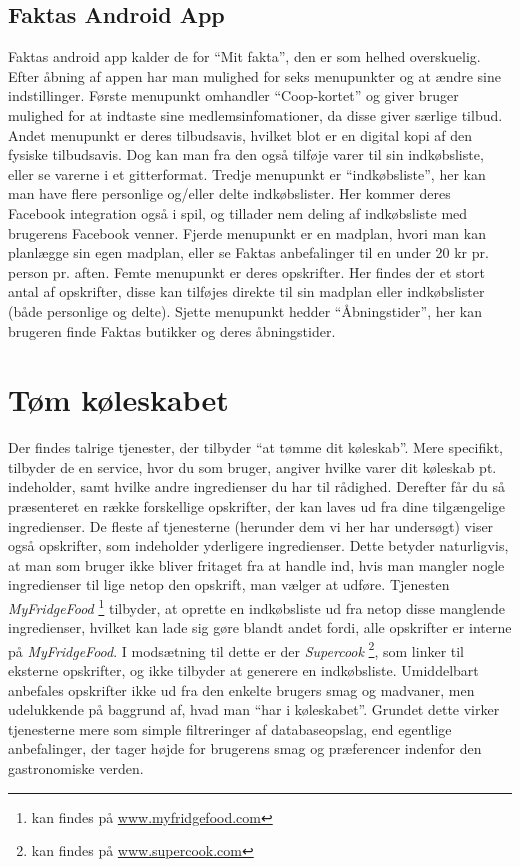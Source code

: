 \subsection{Faktas Android App}
Faktas android app kalder de for ``Mit fakta'', den er som helhed overskuelig.
Efter åbning af appen har man mulighed for seks menupunkter og at ændre sine indstillinger.
Første menupunkt omhandler ``Coop-kortet'' og giver bruger mulighed for at indtaste sine medlemsinfomationer, da disse giver særlige tilbud.
Andet menupunkt er deres tilbudsavis, hvilket blot er en digital kopi af den fysiske tilbudsavis. 
Dog kan man fra den også tilføje varer til sin indkøbsliste, eller se varerne i et gitterformat.
Tredje menupunkt er ``indkøbsliste'', her kan man have flere personlige og/eller delte indkøbslister.
Her kommer deres Facebook integration også i spil, og tillader nem deling af indkøbsliste med brugerens Facebook venner.
Fjerde menupunkt er en madplan, hvori man kan planlægge sin egen madplan, eller se Faktas anbefalinger til en under 20 kr pr. person pr. aften.
Femte menupunkt er deres opskrifter.
Her findes der et stort antal af opskrifter, disse kan tilføjes direkte til sin madplan eller indkøbslister (både personlige og delte).
Sjette menupunkt hedder ``Åbningstider'', her kan brugeren finde Faktas butikker og deres åbningstider. 


\section{Tøm køleskabet}
Der findes talrige tjenester, der tilbyder “at tømme dit køleskab”. 
Mere specifikt, tilbyder de en service, hvor du som bruger, angiver hvilke varer dit køleskab pt. indeholder, samt hvilke andre ingredienser du har til rådighed. 
Derefter får du så præsenteret en række forskellige opskrifter, der kan laves ud fra dine tilgængelige ingredienser. 
De fleste af tjenesterne (herunder dem vi her har undersøgt) viser også opskrifter, som indeholder yderligere ingredienser. 
Dette betyder naturligvis, at man som bruger ikke bliver fritaget fra at handle ind, hvis man mangler nogle ingredienser til lige netop den opskrift, man vælger at udføre. 
Tjenesten \textit{MyFridgeFood} \footnote{kan findes på \underline{www.myfridgefood.com}} tilbyder, at oprette en indkøbsliste ud fra netop disse manglende ingredienser, hvilket kan lade sig gøre blandt andet fordi, alle opskrifter er interne på \textit{MyFridgeFood}. 
I modsætning til dette er der \textit{Supercook} \footnote{kan findes på \underline{www.supercook.com}}, som linker til eksterne opskrifter, og ikke tilbyder at generere en indkøbsliste. 
Umiddelbart anbefales opskrifter ikke ud fra den enkelte brugers smag og madvaner, men udelukkende på baggrund af, hvad man “har i køleskabet”. 
Grundet dette virker tjenesterne mere som simple filtreringer af databaseopslag, end egentlige anbefalinger, der tager højde for brugerens smag og præferencer indenfor den gastronomiske verden.


